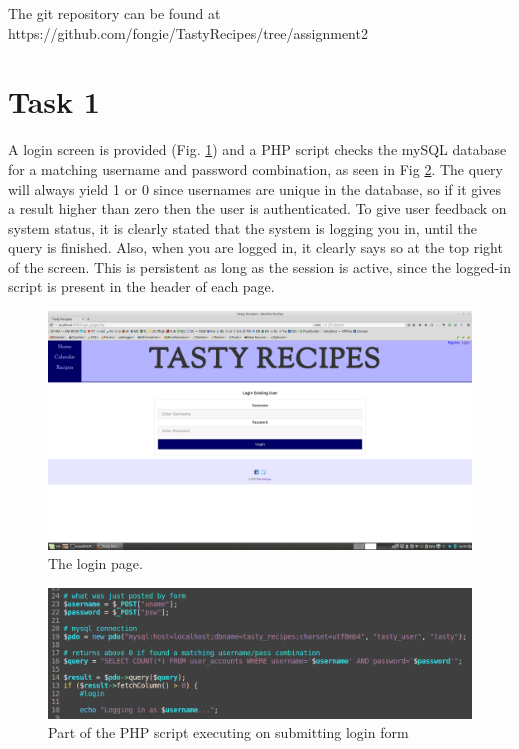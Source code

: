\documentclass[a4paper]{scrreprt}
\begin{document}
The git repository can be found at https://github.com/fongie/TastyRecipes/tree/assignment2

\section{Task 1}

A login screen is provided (Fig. \ref{fig:login}) and a PHP script checks the mySQL database for a matching username and password combination, as seen in Fig \ref{fig:logincode}. The query will always yield 1 or 0 since usernames are unique in the database, so if it gives a result higher than zero then the user is authenticated. To give user feedback on system status, it is clearly stated that the system is logging you in, until the query is finished. Also, when you are logged in, it clearly says so at the top right of the screen. This is persistent as long as the session is active, since the logged-in script is present in the header of each page.

\begin{figure}[h!]
  \begin{center}
    \includegraphics[scale=0.18]{img/login.png}
    \caption{The login page.}
    \label{fig:login}
  \end{center}
\end{figure}

\begin{figure}[h!]
  \begin{center}
    \includegraphics[scale=0.41]{img/logincode.png}
    \caption{Part of the PHP script executing on submitting login form}
    \label{fig:logincode}
  \end{center}
\end{figure}
\end{document}
